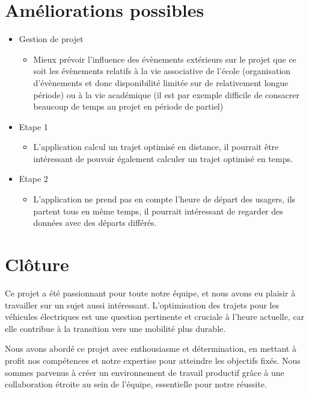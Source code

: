 \documentclass[a4paper, 12pt]{report}
\begin{document}
\section{Améliorations possibles}
\begin{itemize}
    \item Gestion de projet
        \begin{itemize}
            \item Mieux prévoir l'influence des évènements extérieurs sur le projet que ce soit les évènements relatifs à la vie associative de l'école (organisation d'évènements et donc disponibilité limitée sur de relativement longue période) ou à la vie académique (il est par exemple difficile de consacrer beaucoup de temps au projet en période de partiel)
        \end{itemize}
    \bigskip
    \item Etape 1
        \begin{itemize}
            \item L'application calcul un trajet optimisé en distance, il pourrait être intéressant de pouvoir également calculer un trajet optimisé en temps.
        \end{itemize}
        \bigskip
    \item Etape 2
        \begin{itemize}
            \item L'application ne prend pas en compte l'heure de départ des usagers, ils partent tous en même temps, il pourrait intéressant de regarder des données avec des départs différés.
        \end{itemize}
\end{itemize}

\clearpage

\section{Clôture}

Ce projet a été passionnant pour toute notre équipe, et nous avons eu plaisir à travailler sur un sujet aussi intéressant. L'optimisation des trajets pour les véhicules électriques est une question pertinente et cruciale à l'heure actuelle, car elle contribue à la transition vers une mobilité plus durable.
\bigskip

Nous avons abordé ce projet avec enthousiasme et détermination, en mettant à profit nos compétences et notre expertise pour atteindre les objectifs fixés. Nous sommes parvenus à créer un environnement de travail productif grâce à une collaboration étroite au sein de l'équipe, essentielle pour notre réussite.
\bigskip
\end{document}
